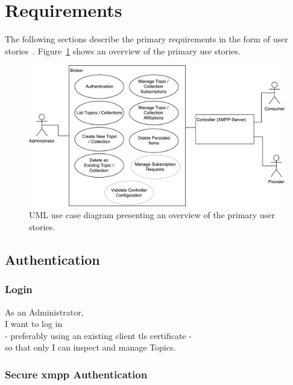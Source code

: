 
\section{Requirements}\label{sec:requirements}

The following sections describe the primary requirements in the form of user stories~\cite{agile-alliance-user-stories}.
Figure~\ref{fig:requirements-overview} shows an overview of the primary use stories.

\begin{figure}[h]
    \centering
    \includegraphics[width=1\linewidth]{resources/requirements_overview}
    \caption{UML use case diagram presenting an overview of the primary user stories.}
    \label{fig:requirements-overview}
\end{figure}

\subsection{Authentication}\label{sec:authentication}
\subsubsection{Login}

As an Administrator,\\
I want to log in\\
- preferably using an existing client \gls{tls} certificate - \\
so that only I can inspect and manage Topics.\\

\subsubsection{Secure \gls{xmpp} Authentication}


